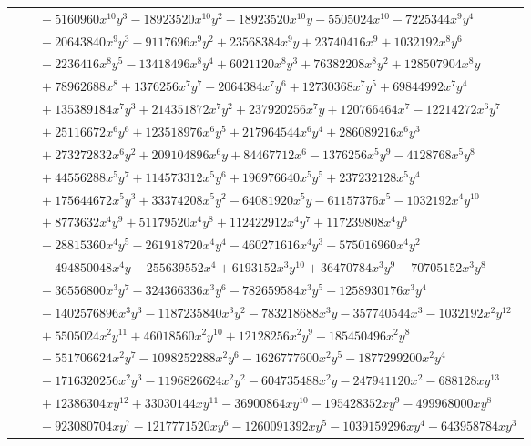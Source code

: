 \documentclass[11pt]{article}
\begin{document}
\begin{longtable}{@{}ll@{}}
 & $\quad -5160960x^{10}y^{3}-18923520x^{10}y^{2}-18923520x^{10}y-5505024x^{10}-7225344x^{9}y^{4}$\\
 & $\quad -20643840x^{9}y^{3}-9117696x^{9}y^{2}+23568384x^{9}y+23740416x^{9}+1032192x^{8}y^{6}$\\
 & $\quad -2236416x^{8}y^{5}-13418496x^{8}y^{4}+6021120x^{8}y^{3}+76382208x^{8}y^{2}+128507904x^{8}y$\\
 & $\quad +78962688x^{8}+1376256x^{7}y^{7}-2064384x^{7}y^{6}+12730368x^{7}y^{5}+69844992x^{7}y^{4}$\\
 & $\quad +135389184x^{7}y^{3}+214351872x^{7}y^{2}+237920256x^{7}y+120766464x^{7}-12214272x^{6}y^{7}$\\
 & $\quad +25116672x^{6}y^{6}+123518976x^{6}y^{5}+217964544x^{6}y^{4}+286089216x^{6}y^{3}$\\
 & $\quad +273272832x^{6}y^{2}+209104896x^{6}y+84467712x^{6}-1376256x^{5}y^{9}-4128768x^{5}y^{8}$\\
 & $\quad +44556288x^{5}y^{7}+114573312x^{5}y^{6}+196976640x^{5}y^{5}+237232128x^{5}y^{4}$\\
 & $\quad +175644672x^{5}y^{3}+33374208x^{5}y^{2}-64081920x^{5}y-61157376x^{5}-1032192x^{4}y^{10}$\\
 & $\quad +8773632x^{4}y^{9}+51179520x^{4}y^{8}+112422912x^{4}y^{7}+117239808x^{4}y^{6}$\\
 & $\quad -28815360x^{4}y^{5}-261918720x^{4}y^{4}-460271616x^{4}y^{3}-575016960x^{4}y^{2}$\\
 & $\quad -494850048x^{4}y-255639552x^{4}+6193152x^{3}y^{10}+36470784x^{3}y^{9}+70705152x^{3}y^{8}$\\
 & $\quad -36556800x^{3}y^{7}-324366336x^{3}y^{6}-782659584x^{3}y^{5}-1258930176x^{3}y^{4}$\\
 & $\quad -1402576896x^{3}y^{3}-1187235840x^{3}y^{2}-783218688x^{3}y-357740544x^{3}-1032192x^{2}y^{12}$\\
 & $\quad +5505024x^{2}y^{11}+46018560x^{2}y^{10}+12128256x^{2}y^{9}-185450496x^{2}y^{8}$\\
 & $\quad -551706624x^{2}y^{7}-1098252288x^{2}y^{6}-1626777600x^{2}y^{5}-1877299200x^{2}y^{4}$\\
 & $\quad -1716320256x^{2}y^{3}-1196826624x^{2}y^{2}-604735488x^{2}y-247941120x^{2}-688128xy^{13}$\\
 & $\quad +12386304xy^{12}+33030144xy^{11}-36900864xy^{10}-195428352xy^{9}-499968000xy^{8}$\\
 & $\quad -923080704xy^{7}-1217771520xy^{6}-1260091392xy^{5}-1039159296xy^{4}-643958784xy^{3}$\\

\end{longtable}
\end{document}
